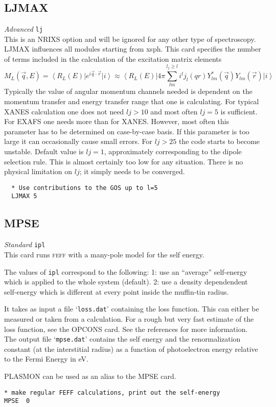 \documentclass[11pt,oneside]{report} %
\newcommand{\bra}[1]{\left<#1\right\vert}
\newcommand{\ket}[1]{\left\vert#1\right>}
\renewcommand{\htmlref}[2]{\hyperlink{#2}{#1}}
\newcommand{\program}[1]{\textsc{#1}}
\newcommand{\feff}{\program{feff}}
\newenvironment{Card}[4]%
      {\vspace{3ex}%
        \subsection{#1}
        \quad\textsl{#3}\newline
        \quad\texttt{#2}\newline%
        \label{card:#4}\\}
      {}
\newcommand{\file}[1]{`\texttt{#1}'}
\renewcommand{\htmlref}[2]{{#1}} %
\begin{document}
\begin{Card}{LJMAX}{lj}{Advanced}{ljm}
  This is an NRIXS option and will be ignored for any other type of spectroscopy.  LJMAX influences all modules starting 
  from xsph.  This card specifies the number of terms included in the calculation of the excitation matrix elements
  \begin{equation} \label{ljmax}
  M_L(\vec{q},E) = \bra{R_L(E)}e^{i \vec{q}\cdot \vec{r}}\ket{i}  \approx \bra{R_L(E)} 4\pi \sum^{l_j \geq l}_{lm} {i^{l} j_l(qr)Y^{*}_{lm}(\vec{q}) Y_{lm}(\vec{r})} \ket{i} 
  \end{equation}
  Typically the value of angular momentum channels needed is dependent on the momentum
  transfer and energy transfer range that one is calculating. For typical XANES calculation one
  does not need $lj > 10$ and most often $lj = 5$ is sufficient. For EXAFS one needs more than for
  XANES. However, most often this parameter has to be determined on case-by-case basis. If
  this parameter is too large it can occasionally cause small errors. For $lj > 25$ the code starts to become unstable.
  Default value is $lj = 1$, approximately corresponding to the dipole selection rule.  This is almost certainly too low for any
  situation.  There is no physical limitation on $lj$; it simply needs to be converged.
\begin{verbatim}
  * Use contributions to the GOS up to l=5
  LJMAX 5
\end{verbatim}
\end{Card}



\begin{Card}{MPSE}{ipl}{Standard}{mps}
 
  This card runs {\feff} with a many-pole model for the self energy.

  The values of  \texttt{ipl} correspond to the following:  
  1: use an ``average'' self-energy which is applied to the whole
     system (default).
  2: use a density dependendent self-energy which is different at
     every point inside the muffin-tin radius.

  It takes as input a file \file{loss.dat} containing the loss function.  This can
  either be measured or taken from a calculation. For a rough but very
  fast estimate of the loss function, see the
  \htmlref{OPCONS}{card:opc} card. See the references for more  
  information.  
  The output file \file{mpse.dat} contains the self energy and the renormalization
  constant (at the interstitial radius) as a function of photoelectron
  energy relative to the Fermi Energy in eV.

  PLASMON can be used as an alias to the MPSE card. 

\begin{verbatim}
* make regular FEFF calculations, print out the self-energy
MPSE  0
\end{verbatim}

\end{Card}
\end{document}
